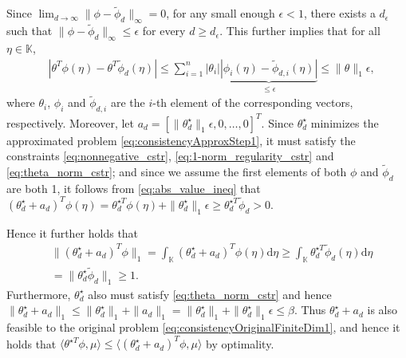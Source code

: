 \begin{pf}  
Since $\lim_{d \to \infty} \|\phi - \tilde{\phi}_d\|_\infty = 0$, for any small enough $\epsilon<1$, there exists a $d_\epsilon$ such that $\|\phi - \tilde{\phi}_d\|_\infty \leq \epsilon$ for every $d \geq d_\epsilon$.
This further implies that for all $\eta \in \mathbb{K}$,
\begin{align}
&| \theta^T \phi(\eta)\! -\! \theta^T \tilde{\phi}_d(\eta)|\! \le\!\! \sum_{i=1}^n\!|\theta_i|\underbrace{|\phi_i(\eta)\!-\!\tilde\phi_{d,i}(\eta)|}_{\le \epsilon}\!\le\! \|\theta\|_1 \epsilon,
\label{eq:abs_value_ineq}
\end{align}
where $\theta_i$, $\phi_i$ and $\tilde{\phi}_{d,i}$ are the $i$-th element of the corresponding vectors, respectively. 
Moreover, let $a_d= [\|\theta_{d}^\star \|_1 \epsilon, 0, \ldots, 0]^T$. Since $\theta_{d}^\star $ minimizes the approximated problem \eqref{eq:consistencyApproxStep1}, it must satisfy the constraints \eqref{eq:nonnegative_cstr}, \eqref{eq:1-norm_regularity_cstr} and \eqref{eq:theta_norm_cstr}; and since we assume the first elements of both $\phi$ and $\tilde \phi_d$ are both 1, 
it follows from \eqref{eq:abs_value_ineq} that
$(\theta_{d}^\star  + a_d)^T \phi(\eta) = \theta_{d}^{\star T} \phi(\eta)+\|\theta_{d}^\star  \|_1\epsilon\ge \theta_{d}^{\star T}\tilde{\phi}_d>0$.

Hence it further holds that
\begin{equation*}
    \begin{aligned}
     & \|(\theta_{d}^\star  \!+\! a_d)^T \phi\|_1\! =\!\! \int_{\mathbb{K}} (\theta_{d}^\star  \!+\! a_d)^T \phi(\eta) \mathrm d\eta
       \! \geq \!\! \int_{\mathbb{K}} \theta_{d}^{\star T} \tilde{\phi}_d(\eta) \mathrm d\eta\\
      &=\|\theta_d^\star\tilde\phi_d\|_1 \geq 1.
    \end{aligned}
\end{equation*}
Furthermore, $\theta_{d}^\star $ also must satisfy \eqref{eq:theta_norm_cstr} and hence
$ \| \theta_{d}^\star  + a_d \|_1 \le \| \theta_{d}^\star  \|_1 +\|a_d\|_1= \| \theta_{d}^\star  \|_1 +  \|\theta_d^\star\|_1 \epsilon \leq \beta$.
Thus $\theta_{d}^\star  + a_d$ is also feasible to the original problem \eqref{eq:consistencyOriginalFiniteDim1}, and hence it holds that $\langle \theta^{\star T} \phi, \mu \rangle\leq \langle (\theta_{d}^\star +a_d)^T \phi, \mu \rangle$ by optimality.


\end{pf}
